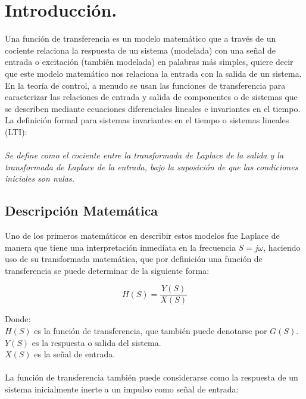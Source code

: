 \documentclass[12pt,a4paper]{article}
\begin{document}
\newpage
\section{Introducción.}
Una función de transferencia es un modelo matemático que a través de un cociente relaciona la respuesta de un sistema (modelada) con una señal de entrada o excitación (también modelada) en palabras más simples, quiere decir que este modelo matemático nos relaciona la entrada con la salida de un sistema.\\
	En la teoría de control, a menudo se usan las funciones de transferencia para caracterizar las relaciones de entrada y salida de componentes o de sistemas que se describen mediante ecuaciones diferenciales lineales e invariantes en el tiempo.\\
	La definición formal para sistemas invariantes en el tiempo o sistemas lineales (LTI): \\
	\\\textit{Se define como el cociente entre la transformada de Laplace de la salida y la transformada de Laplace de la entrada, bajo la suposición de que las condiciones iniciales son nulas.}
	
	\subsection{Descripción Matemática}
	Uno de los primeros matemáticos en describir estos modelos fue Laplace de manera que tiene una interpretación inmediata en la frecuencia $S = j\omega$, haciendo uso de su transformada matemática, que por definición una función de transferencia se puede determinar de la siguiente forma:
	
	\begin{equation*}
		H(S) = \frac{Y(S)}{X(S)}
	\end{equation*}
	
	Donde:\\
	$H(S)$ es la función de transferencia, que también puede denotarse por $G(S)$.\\
	$Y(S)$ es la respuesta o salida del sistema.\\
	$X(S)$ es la señal de entrada.\\
	\\
	La función de transferencia también puede considerarse como la respuesta de un sistema inicialmente inerte a un impulso como señal de entrada:
	
\end{document}
